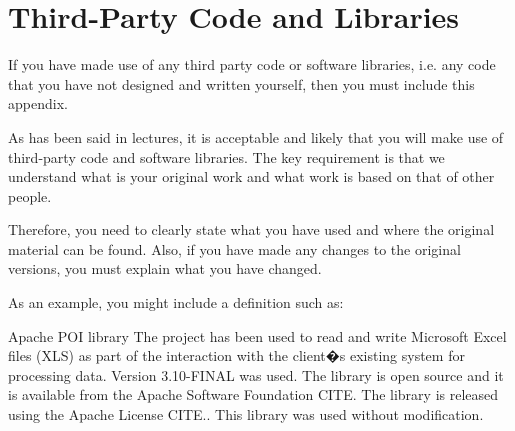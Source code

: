 \chapter{Third-Party Code and Libraries}

If you have made use of any third party code or software libraries, i.e. any code that you have not designed and written yourself, then you must include this appendix. 

As has been said in lectures, it is acceptable and likely that you will make use of third-party code and software libraries. The key requirement is that we understand what is your original work and what work is based on that of other people. 

Therefore, you need to clearly state what you have used and where the original material can be found. Also, if you have made any changes to the original versions, you must explain what you have changed. 

As an example, you might include a definition such as: 

Apache POI library
The project has been used to read and write Microsoft Excel files (XLS) as part of the interaction with the client�s existing system for processing data. Version 3.10-FINAL was used. The library is open source and it is available from the Apache Software Foundation 
CITE. The library is released using the Apache License 
CITE.. This library was used without modification. 
